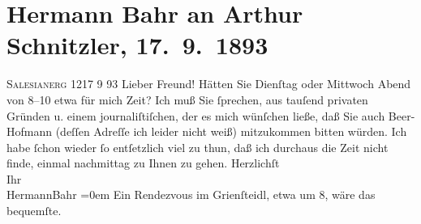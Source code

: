 

         
         \renewcommand{\erwaehntePersonen}{Personen: Hermann Bahr, Richard Beer-Hofmann}
         \renewcommand{\erwaehnteOrte}{Orte: Café Griensteidl, Salesianergasse, Wien}
         \renewcommand{\erwaehnteWerke}{}
               \section[Hermann Bahr an Arthur Schnitzler, 17. 9. 1893]{ Hermann Bahr an Arthur Schnitzler, 17. 9. 1893}\nopagebreak{}\rehead{ }\begin{ledgroupsized}[t]{13cm}\normalsize\beginnumbering \toendnotes[C]{\smallbreak\pagebreak[2]} 
\pstart
           \raggedleft{}{\pb}\textsc{Salesianerg 12}17 9 93\pend
           \pstart\center{}Lieber Freund!\pend\pstart
           Hätten Sie Dienſtag oder Mittwoch Abend von 8–10 etwa für mich Zeit? Ich muß Sie
               ſprechen, aus tauſend privaten Gründen u. einem journaliſtiſchen, der es mich
               wünſchen ließe, daß Sie auch Beer-Hofmann
               (deſſen Adreſſe ich leider nicht weiß) {\pb}mitzukommen
               bitten würden. Ich habe ſchon wieder ſo entſetzlich viel zu thun, daß ich durchaus
               die Zeit nicht finde, einmal nachmittag zu Ihnen zu gehen.\pend
           \pstart
           Herzlichſt{\\[\baselineskip]}Ihr{\\[\baselineskip]}\spacefill\mbox{HermannBahr}\pend
           \leftskip=0em{}\pstart
           \noindent{}Ein Rendezvous im Grienſteidl, etwa um 8, wäre
                  das bequemſte.\pend
           
         
         \endnumbering{}\end{ledgroupsized}  \newcommand{\dateiname}{L00263}\newcommand{\titel}{Hermann Bahr an Arthur Schnitzler, 17. 9. 1893}\newcommand{\editorInnen}{ Kurt Ifkovits,  Martin Anton Müller}
      